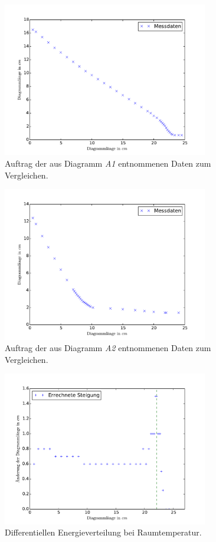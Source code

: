 \begin{figure}[p]
	\centering
	\includegraphics[width=0.8\textwidth]{Bilder/Vert_kalt.pdf}
	\caption{Auftrag der aus Diagramm \emph{A1} entnommenen Daten zum Vergleichen.\cite{matplotlib}}
	\label{fig:E_vert_kalt}
\end{figure}
\begin{figure}[p]
	\centering
	\includegraphics[width=0.8\textwidth]{Bilder/Vert_warm.pdf}
	\caption{Auftrag der aus Diagramm \emph{A2} entnommenen Daten zum Vergleichen.\cite{matplotlib}}
	\label{fig:E_vert_warm}
\end{figure}\begin{figure}[p]
	\centering
	\includegraphics[width=0.8\textwidth]{Bilder/Vert_kalt_diff.pdf}
	\caption{Differentiellen Energieverteilung bei Raumtemperatur.\cite{matplotlib}}
	\label{fig:E_vert_kalt_diff}
\end{figure}
